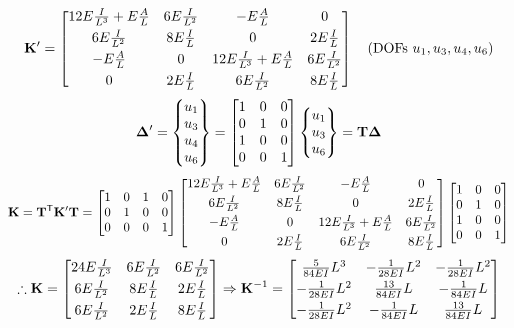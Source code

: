 \begin{equation*}
  \mathbf{K}' = \begin{bmatrix}
    12E\frac{I}{L^3} + E\frac AL & 6E\frac{I}{L^2} & -E\frac AL & 0\\[3pt]
    6E\frac{I}{L^2} & 8E\frac IL & 0 & 2E\frac IL\\[3pt]
    -E\frac AL & 0 & 12E\frac{I}{L^3} + E\frac AL & 6E\frac{I}{L^2}\\[3pt]
    0 & 2E\frac IL & 6E\frac{I}{L^2} & 8E\frac IL
  \end{bmatrix}\quad\text{(DOFs } u_1, u_3, u_4, u_6\text{)}
\end{equation*}
\begin{equation*}
  \bm{\Delta}' = \begin{Bmatrix}u_1\\ u_3\\ u_4\\ u_6\end{Bmatrix} = \begin{bmatrix}1 & 0 & 0\\ 0 & 1 & 0\\ 1 & 0 & 0\\ 0 & 0 & 1\end{bmatrix}\begin{Bmatrix}u_1\\ u_3\\ u_6\end{Bmatrix} = \mathbf{T}\bm{\Delta}
\end{equation*}
\begin{equation*}
  \mathbf{K} = \mathbf{T}^{\mathsf{T}}\mathbf{K}'\mathbf{T} = \begin{bmatrix}1 & 0 & 1 & 0\\ 0 & 1 & 0 & 0\\ 0 & 0 & 0 & 1\end{bmatrix}
  \begin{bmatrix}
    12E\frac{I}{L^3} + E\frac AL & 6E\frac{I}{L^2} & -E\frac AL & 0\\[3pt]
    6E\frac{I}{L^2} & 8E\frac IL & 0 & 2E\frac IL\\[3pt]
    -E\frac AL & 0 & 12E\frac{I}{L^3} + E\frac AL & 6E\frac{I}{L^2}\\[3pt]
    0 & 2E\frac IL & 6E\frac{I}{L^2} & 8E\frac IL
  \end{bmatrix}\begin{bmatrix}1 & 0 & 0\\ 0 & 1 & 0\\ 1 & 0 & 0\\ 0 & 0 & 1\end{bmatrix}
\end{equation*}
\begin{equation*}
  \therefore\mathbf{K} = \begin{bmatrix}24E\frac{I}{L^3} & 6E\frac{I}{L^2} & 6E\frac{I}{L^2}\\[3pt] 6E\frac{I}{L^2} & 8E\frac IL & 2E\frac IL\\[3pt] 6E\frac{I}{L^2} & 2E\frac IL & 8E\frac IL\end{bmatrix}
  \Rightarrow \mathbf{K}^{-1} = \begin{bmatrix}\frac{5}{84EI}L^3 & -\frac{1}{28EI}L^2 & -\frac{1}{28EI}L^2\\[3pt] -\frac{1}{28EI}L^2 & \frac{13}{84EI}L & -\frac{1}{84EI}L\\[3pt] -\frac{1}{28EI}L^2 & -\frac{1}{84EI}L & \frac{13}{84EI}L\end{bmatrix}
\end{equation*}
